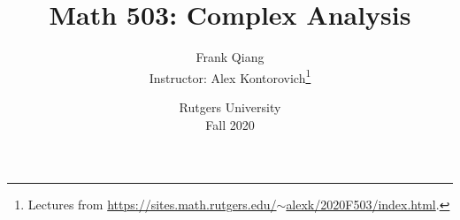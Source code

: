 \documentclass[12pt, letterpaper, oneside]{book}
\title{Math 503: Complex Analysis}
\author{Frank Qiang\\Instructor: Alex Kontorovich\footnote{Lectures from \href{https://sites.math.rutgers.edu/~alexk/2020F503/index.html}{https://sites.math.rutgers.edu/$\sim$alexk/2020F503/index.html}.}}
\date{Rutgers University\\Fall 2020}
\theoremstyle{definition}
\begin{document}
  \maketitle

  \begingroup
  \let\cleardoublepage\clearpage
  \tableofcontents
  \endgroup

  
  
  
  
\end{document}
